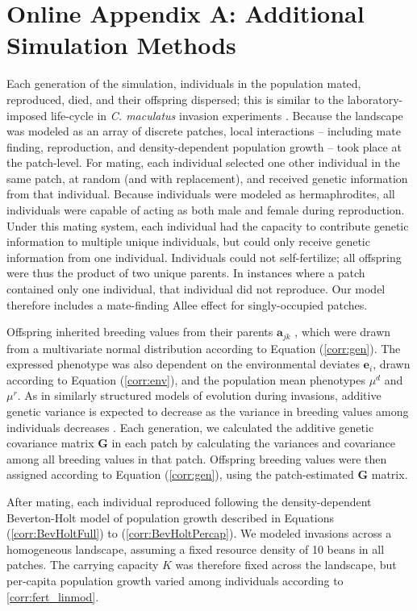 \documentclass[11pt]{article}
\begin{document}
\section*{Online Appendix A: Additional Simulation Methods}
Each generation of the simulation, individuals in the population mated, reproduced, died, and their offspring dispersed; this is similar to the laboratory-imposed life-cycle in \textit{C. maculatus} invasion experiments \citep{miller_sex_2013,wagner_genetic_2016,ochocki_rapid_2017}.
Because the landscape was modeled as an array of discrete patches, local interactions -- including mate finding, reproduction, and density-dependent population growth -- took place at the patch-level.
For mating, each individual selected one other individual in the same patch, at random (and with replacement), and received genetic information from that individual.
Because individuals were modeled as hermaphrodites, all individuals were capable of acting as both male and female during reproduction.
Under this mating system, each individual had the capacity to contribute genetic information to multiple unique individuals, but could only receive genetic information from one individual.
Individuals could not self-fertilize; all offspring were thus the product of two unique parents.
In instances where a patch contained only one individual, that individual did not reproduce.
Our model therefore includes a mate-finding Allee effect for singly-occupied patches.

Offspring inherited breeding values from their parents $\bm{a}_{jk}$ , which were drawn from a multivariate normal distribution according to Equation (\ref{corr:gen}).
The expressed phenotype was also dependent on the environmental deviates $\bm{e}_{i}$, drawn according to Equation (\ref{corr:env}), and the population mean phenotypes $\mu^{d}$ and $\mu^{r}$.
As in similarly structured models of evolution during invasions, additive genetic variance is expected to decrease as the variance in breeding values among individuals decreases \citep{phillips_evolutionary_2015}.
Each generation, we calculated the additive genetic covariance matrix $\bm{G}$ in each patch by calculating the variances and covariance among all breeding values in that patch.
Offspring breeding values were then assigned according to Equation (\ref{corr:gen}), using the patch-estimated $\bm{G}$ matrix.

After mating, each individual reproduced following the density-dependent Beverton-Holt model of population growth described in Equations (\ref{corr:BevHoltFull}) to (\ref{corr:BevHoltPercap}).
We modeled invasions across a homogeneous landscape, assuming a fixed resource density of 10 beans in all patches. The carrying capacity $K$ was therefore fixed across the landscape, but per-capita population growth varied among individuals according to \ref{corr:fert_linmod}.
\end{document}
